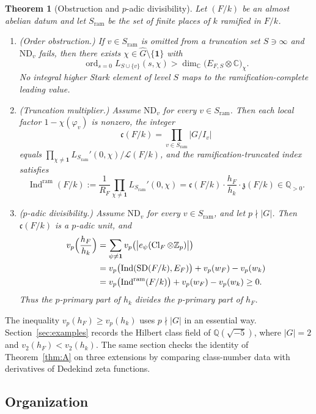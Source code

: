 \documentclass[11pt]{article}
\theoremstyle{plain}
\newtheorem{theorem}{Theorem}[section]
\theoremstyle{definition}
\theoremstyle{remark}
\newcommand{\Z}{\mathbb{Z}}
\newcommand{\Q}{\mathbb{Q}}
\newcommand{\C}{\mathbb{C}}
\newcommand{\Cl}{\operatorname{Cl}}
\newcommand{\Ind}{\operatorname{Ind}}
\newcommand{\ord}{\operatorname{ord}}
\newcommand{\triv}{\mathbf{1}}
\newcommand{\ram}{\mathrm{ram}}
\newcommand{\SD}{\mathrm{SD}}
\begin{document}
\begin{theorem}[Obstruction and $p$-adic divisibility]
\label{thm:C}
Let $(F/k)$ be an almost abelian datum and let $S_{\ram}$ be the set of finite places of $k$ ramified in $F/k$.
\begin{enumerate}[label=\textup{(\roman*)}]
\item \textup{(Order obstruction.)}
If $v\in S_{\ram}$ is omitted from a truncation set $S\ni\infty$ and $\mathrm{ND}_v$ fails, then there exists $\chi\in\widehat G\setminus\{\triv\}$ with
\[
  \ord_{s=0}L_{S\cup\{v\}}(s,\chi)
  >\dim_{\C}\bigl(E_{F,S}\otimes\C\bigr)_{\chi}.
\]
No integral higher Stark element of level $S$ maps to the ramification-complete leading value.
\item \textup{(Truncation multiplier.)}
Assume $\mathrm{ND}_v$ for every $v\in S_{\ram}$.
Then each local factor $1-\chi(\varphi_v)$ is nonzero, the integer
\[
  \mathfrak{c}(F/k)=\prod_{v\in S_{\ram}}|G/I_v|
\]
equals $\prod_{\chi\neq\triv}L_{S_{\ram}}'(0,\chi)\big/\mathcal{L}(F/k)$, and the ramification-truncated index satisfies
\[
  \Ind^{\ram}(F/k)
  :=\frac{1}{R_F}\prod_{\chi\neq\triv}L_{S_{\ram}}'(0,\chi)
  =\mathfrak{c}(F/k)\cdot\frac{h_F}{h_k}\cdot\mathfrak{z}(F/k)\in\Q_{>0}.
\]
\item \textup{($p$-adic divisibility.)}
Assume $\mathrm{ND}_v$ for every $v\in S_{\ram}$, and let $p\nmid|G|$.
Then $\mathfrak{c}(F/k)$ is a $p$-adic unit, and
\begin{align*}
  v_p\Bigl(\frac{h_F}{h_k}\Bigr)
  &=\sum_{\psi\neq\triv}v_p\bigl(\bigl|e_{\psi}(\Cl_F\otimes\Z_p)\bigr|\bigr)\\
  &=v_p\bigl(\Ind(\SD(F/k),E_F)\bigr)+v_p(w_F)-v_p(w_k)\\
  &=v_p\bigl(\Ind^{\ram}(F/k)\bigr)+v_p(w_F)-v_p(w_k)\ge 0.
\end{align*}
Thus the $p$-primary part of $h_k$ divides the $p$-primary part of $h_F$.
\end{enumerate}
\end{theorem}

The inequality $v_p(h_F)\ge v_p(h_k)$ uses $p\nmid|G|$ in an essential way.
Section~\ref{sec:examples} records the Hilbert class field of $\Q(\sqrt{-5})$, where $|G|=2$ and $v_2(h_F)<v_2(h_k)$.
The same section checks the identity of Theorem~\ref{thm:A} on three extensions by comparing class-number data with derivatives of Dedekind zeta functions.

\subsection{Organization}
\end{document}
